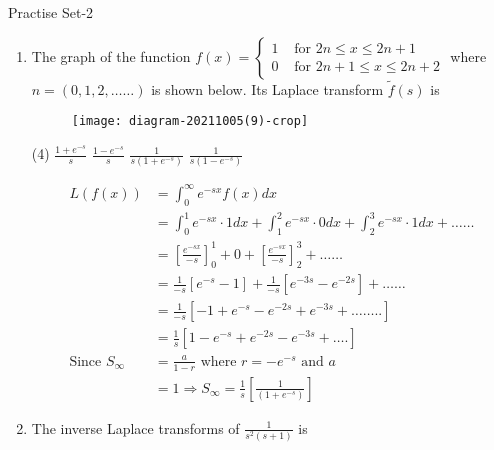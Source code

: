 \begin{abox}
	Practise Set-2
\end{abox}
\begin{enumerate}
	\item The graph of the function $f(x)=\left\{\begin{array}{ll}1 & \text { for } 2 n \leq x \leq 2 n+1 \\ 0 & \text { for } 2 n+1 \leq x \leq 2 n+2\end{array}\right.$ where $n=(0,1,2, \ldots \ldots)$ is shown below. Its Laplace transform $\tilde{f}(s)$ is
	{	}
	
	\begin{figure}[H]
		\centering
		\texttt{[image: diagram-20211005(9)-crop]}
	\end{figure}
	\begin{tasks}(4)
		\task[\textbf{A.}] $\frac{1+e^{-s}}{s}$
		\task[\textbf{B.}] $\frac{1-e^{-s}}{s}$
		\task[\textbf{C.}] $\frac{1}{s\left(1+e^{-s}\right)}$
		\task[\textbf{D.}]  $\frac{1}{s\left(1-e^{-s}\right)}$
	\end{tasks}
	\begin{answer}
		\begin{align*}
		L(f(x))&=\int_{0}^{\infty} e^{-s x} f(x) d x\\&=\int_{0}^{1} e^{-s x} \cdot 1 d x+\int_{1}^{2} e^{-s x} \cdot 0 d x+\int_{2}^{3} e^{-s x} \cdot 1 d x+\ldots \ldots\\
		&=\left[\frac{e^{-s x}}{-s}\right]_{0}^{1}+0+\left[\frac{e^{-s x}}{-s}\right]_{2}^{3}+\ldots \ldots\\&=\frac{1}{-s}\left[e^{-s}-1\right]+\frac{1}{-s}\left[e^{-3 s}-e^{-2 s}\right]+\ldots \ldots\\
		&=\frac{1}{-s}\left[-1+e^{-s}-e^{-2 s}+e^{-3 s}+\ldots \ldots . .\right]\\&=\frac{1}{s}\left[1-e^{-s}+e^{-2 s}-e^{-3 s}+\ldots .\right]\\
		\text{Since }S_{\infty}&=\frac{a}{1-r}\text{ where }r=-e^{-s}\text{ and }a\\&=1 \Rightarrow S_{\infty}=\frac{1}{s}\left[\frac{1}{\left(1+e^{-s}\right)}\right]
		\end{align*}
	\end{answer}
	\item The inverse Laplace transforms of $\frac{1}{s^{2}(s+1)}$ is
	{}
	

\end{enumerate}
